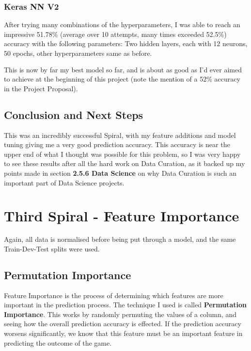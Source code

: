 \documentclass[12pt,a4paper,twoside,openright]{report}
\begin{document}
\subsubsection{Keras NN V2}

After trying many combinations of the hyperparameters, I was able to reach an impressive 51.78\% (average over 10 attempts, many times exceeded 52.5\%) accuracy with the following parameters: Two hidden layers, each with 12 neurons, 50 epochs, other hyperparameters same as before.

This is now by far my best model so far, and is about as good as I'd ever aimed to achieve at the beginning of this project (note the mention of a 52\% accuracy in the Project Proposal). 

\subsection{Conclusion and Next Steps}

This was an incredibly successful Spiral, with my feature additions and model tuning giving me a very good prediction accuracy. This accuracy is near the upper end of what I thought was possible for this problem, so I was very happy to see these results after all the hard work on Data Curation, as it backed up my points made in section \textbf{2.5.6 Data Science} on why Data Curation is such an important part of Data Science projects.

\section{Third Spiral - Feature Importance}

Again, all data is normalised before being put through a model, and the same Train-Dev-Test splits were used.

\subsection{Permutation Importance}

Feature Importance is the process of determining which features are more important in the prediction process. The technique I used is called \textbf{Permutation Importance}. This works by randomly permuting the values of a column, and seeing how the overall prediction accuracy is effected. If the prediction accuracy worsens significantly, we know that this feature must be an important feature in predicting the outcome of the game.
\end{document}
